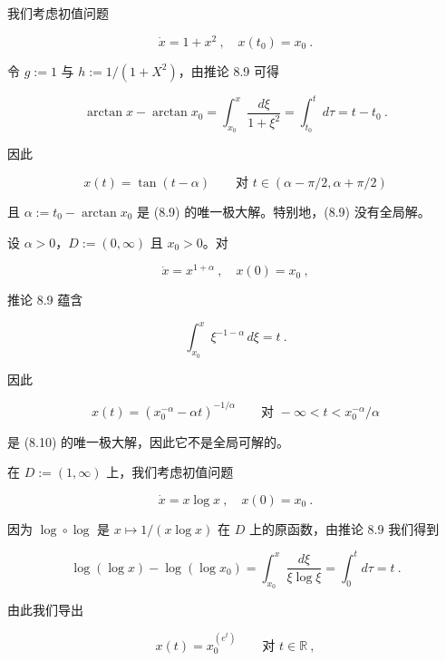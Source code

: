 \begin{example}

\begin{items}
\item

我们考虑初值问题

\begin{equation}
\dot{x}=1+x^{2}\ ,\quad x(t_{0})=x_{0}\ .\tag{8.9}
\end{equation}

令 $ g:=1 $ 与 $ h:=1/(1+X^{2}) $，由推论 8.9 可得

\[
\arctan x-\arctan x_{0}=\int_{x_{0}}^{x}\frac{d\xi}{1+\xi^{2}}=\int_{t_{0}}^{t}d\tau=t-t_{0} \ .
\]

因此

\[
x(t)=\tan(t-\alpha)\qquad\text{对 }t\in(\alpha-\pi/2,\alpha+\pi/2)
\]

且 $ \alpha:=t_{0}-\arctan x_{0} $ 是 (8.9) 的唯一极大解。特别地，(8.9) 没有全局解。

\item

设 $ \alpha>0 $，$ D:=(0,\infty) $ 且 $ x_{0}>0 $。对

\begin{equation}
\dot{x}=x^{1+\alpha}\ ,\quad x(0)=x_{0}\ ,\tag{8.10}
\end{equation}

推论 8.9 蕴含

\[
\int_{x_{0}}^{x}\xi^{-1-\alpha}\,d\xi=t \ .
\]

因此

\[
x(t)=(x_{0}^{-\alpha}-\alpha t)^{-1/\alpha}\qquad\text{对 }-\infty<t<x_{0}^{-\alpha}/\alpha
\]

是 (8.10) 的唯一极大解，因此它不是全局可解的。

\item

在 $ D:=(1,\infty) $ 上，我们考虑初值问题

\begin{equation}
\dot{x}=x\log x\ ,\quad x(0)=x_{0}\ .\tag{8.11}
\end{equation}

因为 $ \log\circ\log $ 是 $ x\mapsto 1/(x\log x) $ 在 $ D $ 上的原函数，由推论 8.9 我们得到

\[
\log(\log x)-\log(\log x_{0})=\int_{x_{0}}^{x}\frac{d\xi}{\xi\log\xi}=\int_{0}^{t}d\tau=t \ .
\]

由此我们导出

\[
x(t)=x_{0}^{(e^{t})}\qquad\text{对 }t\in\mathbb{R}\ ,
\]


\end{items}
\end{example}

